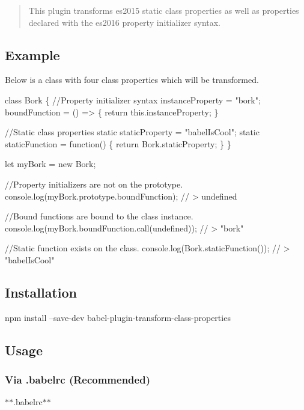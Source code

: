 \begin{quote}
This plugin transforms es2015 static class properties as well as properties declared with the es2016 property initializer syntax. \end{quote}


\subsection*{Example}

Below is a class with four class properties which will be transformed.


\begin{DoxyCode}
class Bork \{
  //Property initializer syntax
  instanceProperty = "bork";
  boundFunction = () => \{
    return this.instanceProperty;
  \}

  //Static class properties
  static staticProperty = "babelIsCool";
  static staticFunction = function() \{
    return Bork.staticProperty;
  \}
\}

let myBork = new Bork;

//Property initializers are not on the prototype.
console.log(myBork.prototype.boundFunction); // > undefined

//Bound functions are bound to the class instance.
console.log(myBork.boundFunction.call(undefined)); // > "bork"

//Static function exists on the class.
console.log(Bork.staticFunction()); // > "babelIsCool"
\end{DoxyCode}


\subsection*{Installation}


\begin{DoxyCode}
npm install --save-dev babel-plugin-transform-class-properties
\end{DoxyCode}


\subsection*{Usage}

\subsubsection*{Via {\ttfamily .babelrc} (Recommended)}

$\ast$$\ast$.babelrc$\ast$$\ast$


